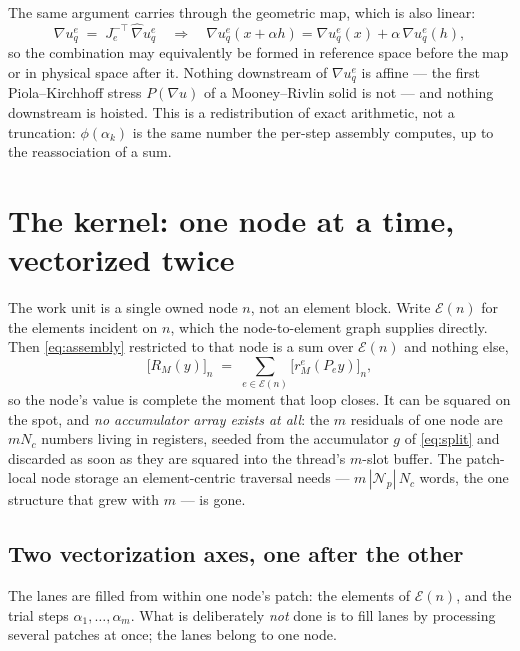 \documentclass[11pt]{article}
\newcommand{\gradhat}{\widehat{\nabla}}
\begin{document}
The same argument carries through the geometric map, which is also linear:
\begin{equation}
  \nabla u^e_q \;=\; J_e^{-\top}\,\gradhat u^e_q
  \quad\Longrightarrow\quad
  \nabla u^e_q(x+\alpha h) = \nabla u^e_q(x) + \alpha\,\nabla u^e_q(h),
\end{equation}
so the combination may equivalently be formed in reference space before the map or
in physical space after it.  Nothing downstream of $\nabla u^e_q$ is affine ---
the first Piola--Kirchhoff stress $P(\nabla u)$ of a Mooney--Rivlin solid is not
--- and nothing downstream is hoisted.  This is a redistribution of exact
arithmetic, not a truncation: $\phi(\alpha_k)$ is the same number the per-step
assembly computes, up to the reassociation of a sum.

\section{The kernel: one node at a time, vectorized twice}
\label{sec:kernel}

The work unit is a single owned node $n$, not an element block.  Write
$\mathcal{E}(n)$ for the elements incident on $n$, which the node-to-element
graph supplies directly.  Then \eqref{eq:assembly} restricted to that node is a
sum over $\mathcal{E}(n)$ and nothing else,
\begin{equation}
  \bigl[R_M(y)\bigr]_n \;=\; \sum_{e\in\mathcal{E}(n)} \bigl[r^e_M(P_e y)\bigr]_n ,
  \label{eq:nodecentric}
\end{equation}
so the node's value is complete the moment that loop closes.  It can be squared
on the spot, and \emph{no accumulator array exists at all}: the $m$ residuals of
one node are $m N_c$ numbers living in registers, seeded from the accumulator
$g$ of \eqref{eq:split} and discarded as soon as they are squared into the
thread's $m$-slot buffer.  The patch-local node storage an element-centric
traversal needs --- $m\,|\mathcal{N}_p|\,N_c$ words, the one structure that grew
with $m$ --- is gone.

\subsection*{Two vectorization axes, one after the other}

The lanes are filled from within one node's patch: the elements of
$\mathcal{E}(n)$, and the trial steps $\alpha_1,\dots,\alpha_m$.  What is
deliberately \emph{not} done is to fill lanes by processing several patches at
once; the lanes belong to one node.
\end{document}
